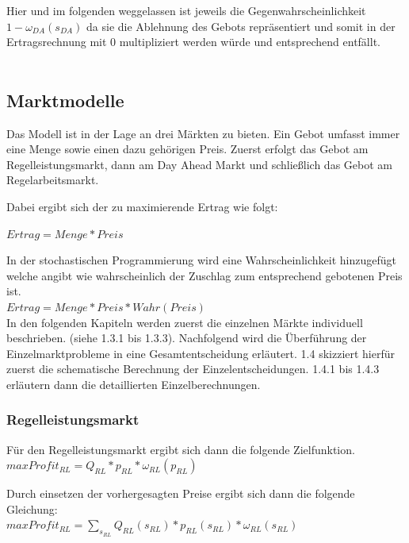 
Hier und im folgenden weggelassen ist jeweils die Gegenwahrscheinlichkeit $1-\omega_{DA}(s_{DA})$ da sie die Ablehnung des Gebots repräsentiert und somit in der Ertragsrechnung mit 0 multipliziert werden würde und entsprechend entfällt.\\
\\

\subsection{Marktmodelle}

Das Modell ist in der Lage an drei Märkten zu bieten. Ein Gebot umfasst immer eine Menge sowie einen dazu gehörigen Preis. Zuerst erfolgt das Gebot am Regelleistungsmarkt, dann am Day Ahead Markt und schließlich das Gebot am Regelarbeitsmarkt.

Dabei ergibt sich der zu maximierende Ertrag wie folgt:

$Ertrag = Menge * Preis$

In der stochastischen Programmierung wird eine Wahrscheinlichkeit hinzugefügt welche angibt wie wahrscheinlich der Zuschlag zum entsprechend gebotenen Preis ist.\\

$Ertrag = Menge * Preis * Wahr(Preis)$\\

In den folgenden Kapiteln werden zuerst die einzelnen Märkte  individuell beschrieben. (siehe 1.3.1 bis 1.3.3).
Nachfolgend wird die Überführung der Einzelmarktprobleme in eine Gesamtentscheidung erläutert.
1.4 skizziert hierfür zuerst die schematische Berechnung der Einzelentscheidungen.
1.4.1 bis 1.4.3 erläutern dann die detaillierten Einzelberechnungen.

\subsubsection{Regelleistungsmarkt}
Für den Regelleistungsmarkt ergibt sich dann die folgende Zielfunktion.\\

$max Profit_{RL} = Q_{RL} * p_{RL} * \omega_{RL}(p_{RL})$

Durch einsetzen der vorhergesagten Preise ergibt sich dann die folgende Gleichung:\\

$max Profit_{RL} = \sum_{s_{RL}} Q_{RL}(s_{RL}) * p_{RL}(s_{RL}) * \omega_{RL}(s_{RL})$\\

